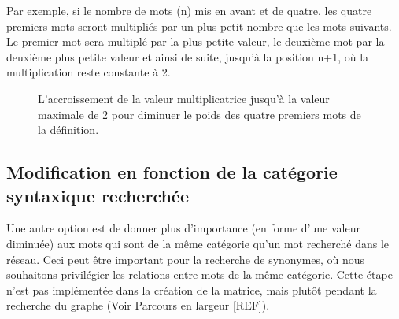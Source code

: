 Par exemple, si le nombre de mots (n) mis en avant et de quatre, les quatre premiers mots seront multipliés par un plus petit nombre que les mots suivants. Le premier mot sera multiplé par la plus petite valeur, le deuxième mot par la deuxième plus petite valeur et ainsi de suite, jusqu'à la position n+1, où la multiplication reste constante à 2.


\begin{figure}
\centering
\parbox{5cm}{
\def\svgscale{1}

\caption{L'accroissement de la valeur multiplicatrice jusqu'à la valeur maximale de 2 pour diminuer le poids des quatre premiers mots de la définition.}
\label{fig:multiply}}
\end{figure}

\subsection{Modification en fonction de la catégorie syntaxique recherchée}
Une autre option est de donner plus d'importance (en forme d'une valeur diminuée) aux mots qui sont de la même catégorie qu'un mot recherché dans le réseau. Ceci peut être important pour la recherche de synonymes, où nous souhaitons privilégier les relations entre mots de la même catégorie. Cette étape n'est pas implémentée dans la création de la matrice, mais plutôt pendant la recherche du graphe (Voir Parcours en largeur [REF]).







